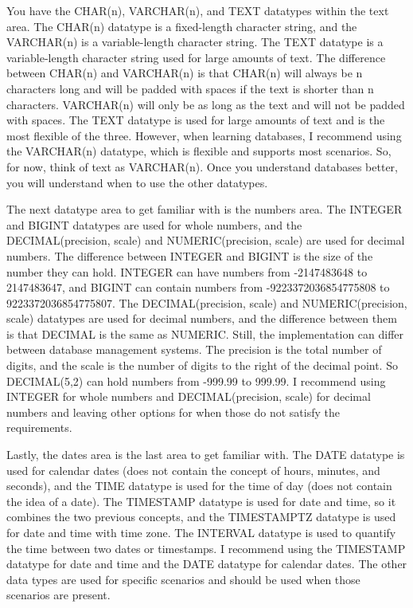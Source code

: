 You have the CHAR(n), VARCHAR(n), and TEXT datatypes within the text area. The CHAR(n) datatype is a fixed-length character string, and the VARCHAR(n) is a variable-length character string. The TEXT datatype is a variable-length character string used for large amounts of text. The difference between CHAR(n) and VARCHAR(n) is that CHAR(n) will always be n characters long and will be padded with spaces if the text is shorter than n characters. VARCHAR(n) will only be as long as the text and will not be padded with spaces. The TEXT datatype is used for large amounts of text and is the most flexible of the three. However, when learning databases, I recommend using the VARCHAR(n) datatype, which is flexible and supports most scenarios. So, for now, think of text as VARCHAR(n). Once you understand databases better, you will understand when to use the other datatypes.

The next datatype area to get familiar with is the numbers area. The INTEGER and BIGINT datatypes are used for whole numbers, and the DECIMAL(precision, scale) and NUMERIC(precision, scale) are used for decimal numbers. The difference between INTEGER and BIGINT is the size of the number they can hold. INTEGER can have numbers from -2147483648 to 2147483647, and BIGINT can contain numbers from -9223372036854775808 to 9223372036854775807. The DECIMAL(precision, scale) and NUMERIC(precision, scale) datatypes are used for decimal numbers, and the difference between them is that DECIMAL is the same as NUMERIC. Still, the implementation can differ between database management systems. The precision is the total number of digits, and the scale is the number of digits to the right of the decimal point. So DECIMAL(5,2) can hold numbers from -999.99 to 999.99. I recommend using INTEGER for whole numbers and DECIMAL(precision, scale) for decimal numbers and leaving other options for when those do not satisfy the requirements.

Lastly, the dates area is the last area to get familiar with. The DATE datatype is used for calendar dates (does not contain the concept of hours, minutes, and seconds), and the TIME datatype is used for the time of day (does not contain the idea of a date). The TIMESTAMP datatype is used for date and time, so it combines the two previous concepts, and the TIMESTAMPTZ datatype is used for date and time with time zone. The INTERVAL datatype is used to quantify the time between two dates or timestamps. I recommend using the TIMESTAMP datatype for date and time and the DATE datatype for calendar dates. The other data types are used for specific scenarios and should be used when those scenarios are present.

